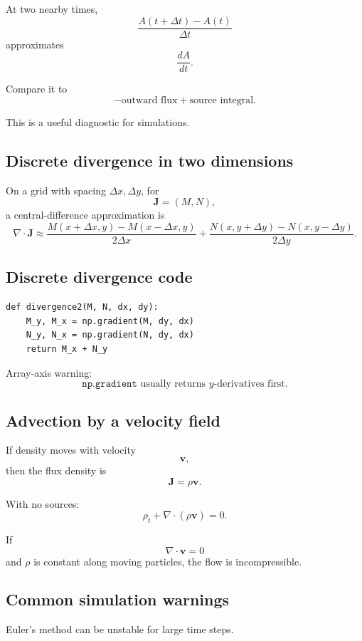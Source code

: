 At two nearby times,
\[
\boxed{
    \frac{A(t+\Delta t)-A(t)}{\Delta t}
}
\]
approximates
\[
    \frac{dA}{dt}.
\]

Compare it to
\[
\boxed{
    -\text{outward flux}+\text{source integral}.
}
\]

This is a useful diagnostic for simulations.

\subsection*{Discrete divergence in two dimensions}

On a grid with spacing \(\Delta x,\Delta y\), for
\[
    \mathbf J=(M,N),
\]
a central-difference approximation is
\[
\boxed{
    \nabla\cdot\mathbf J
    \approx
    \frac{M(x+\Delta x,y)-M(x-\Delta x,y)}{2\Delta x}
    +
    \frac{N(x,y+\Delta y)-N(x,y-\Delta y)}{2\Delta y}.
}
\]

\subsection*{Discrete divergence code}

\begin{verbatim}
def divergence2(M, N, dx, dy):
    M_y, M_x = np.gradient(M, dy, dx)
    N_y, N_x = np.gradient(N, dy, dx)
    return M_x + N_y
\end{verbatim}

Array-axis warning:
\[
\boxed{
    \texttt{np.gradient} \text{ usually returns } y\text{-derivatives first.}
}
\]

\subsection*{Advection by a velocity field}

If density moves with velocity
\[
    \mathbf v,
\]
then the flux density is
\[
\boxed{
    \mathbf J=\rho\mathbf v.
}
\]

With no sources:
\[
\boxed{
    \rho_t+\nabla\cdot(\rho\mathbf v)=0.
}
\]

If
\[
    \nabla\cdot\mathbf v=0
\]
and \(\rho\) is constant along moving particles, the flow is incompressible.

\subsection*{Common simulation warnings}

Euler's method can be unstable for large time steps.

